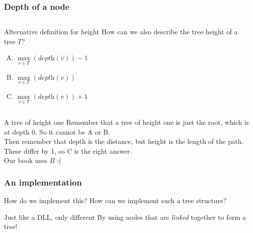 \begin{frame}
	\frametitle{Depth of a node}

	\begin{columns}
		\begin{questionblock}{Alternative definition for height}
			How can we also describe the tree height of a tree $T$?
			\pause
			\begin{enumerate}[A.]
				\item $\max\limits_{v\in T}({\textit{depth}(v)})-1$
				\item $\max\limits_{v\in T}({\textit{depth}(v)})$
				\item $\max\limits_{v\in T}({\textit{depth}(v)})+1$
			\end{enumerate}
		\end{questionblock}
	\end{columns}
	\pause
	\begin{answerblock}{A tree of height one}
		Remember that a tree of height one is just the root, which is at depth $0$. So it cannot be A or B.\\
		Then remember that depth is the distance, but height is the length of the path. These differ by 1, so C is the right
		answer.\\
		Our book uses $B$ :( 
	\end{answerblock}
\end{frame}

\begin{frame}
	\frametitle{An implementation}
	
	\begin{questionblock}{How do we implement this?}
		How can we implement such a tree structure?
	\end{questionblock}
	\pause
	\begin{answerblock}{Just like a DLL, only different}
		By using nodes that are \textit{linked} together to form a tree!
	\end{answerblock}
	\pause
	\begin{columns}[t]
		\column{0.535\textwidth}
	
			
		\column{0.505\textwidth}
	
			
	\end{columns}
\end{frame}

